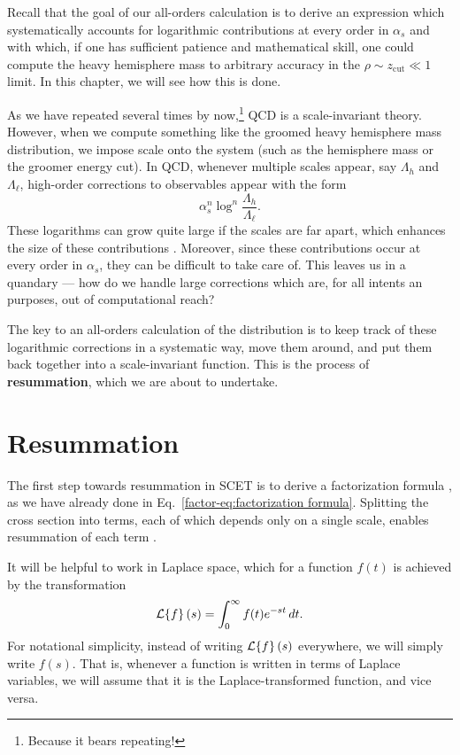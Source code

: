 \documentclass[../thesis.tex]{subfiles}
\providecommand{\zcut}{z_\mathrm{{cut}}}
\providecommand{\cL}{\mathcal{L}}
\begin{document}
	Recall that the goal of our all-orders calculation is to derive an expression which systematically accounts for logarithmic contributions at every order in $\alpha_s$ and with which, if one has sufficient patience and mathematical skill, one could compute the heavy hemisphere mass to arbitrary accuracy in the $\rho \sim \zcut \ll 1$ limit. In this chapter, we will see how this is done.

	As we have repeated several times by now,\footnote{Because it bears repeating!} QCD is a scale-invariant theory. However, when we compute something like the groomed heavy hemisphere mass distribution, we impose scale onto the system (such as the hemisphere mass or the groomer energy cut). In QCD, whenever multiple scales appear, say $\Lambda_h$ and $\Lambda_\ell$, high-order corrections to observables appear with the form \cite{becher_introduction_2015-1}
	\begin{equation}
		\alpha_s^n \log^{n}\frac{\Lambda_h}{\Lambda_\ell}.
	\end{equation}
	These logarithms can grow quite large if the scales are far apart, which enhances the size of these contributions \cite{schwartz_quantum_2014}. Moreover, since these contributions occur at every order in $\alpha_s$, they can be difficult to take care of. This leaves us in a quandary --- how do we handle large corrections which are, for all intents an purposes, out of computational reach?

	The key to an all-orders calculation of the distribution is to keep track of these logarithmic corrections in a systematic way, move them around, and put them back together into a scale-invariant function. This is the process of \textbf{resummation}, which we are about to undertake.

\section{Resummation}\label{all-sec:resummation}
	The first step towards resummation in SCET is to derive a factorization formula \cite{becher_introduction_2015-1}, as we have already done in Eq.~\ref{factor-eq:factorization formula}. Splitting the cross section into terms, each of which depends only on a single scale, enables resummation of each term \cite{frye_factorization_2016}.

	It will be helpful to work in Laplace space, which for a function $f(t)$ is achieved by the transformation \cite{boas_mathematical_2006}
	\begin{equation}
		\cL\qty{f}(s) = \int_0^\infty f(t) e^{-st}\,dt.
	\end{equation}
	For notational simplicity, instead of writing $\cL\qty{f}(s)$ everywhere, we will simply write $f(s)$. That is, whenever a function is written in terms of Laplace variables, we will assume that it is the Laplace-transformed function, and vice versa.
\end{document}
